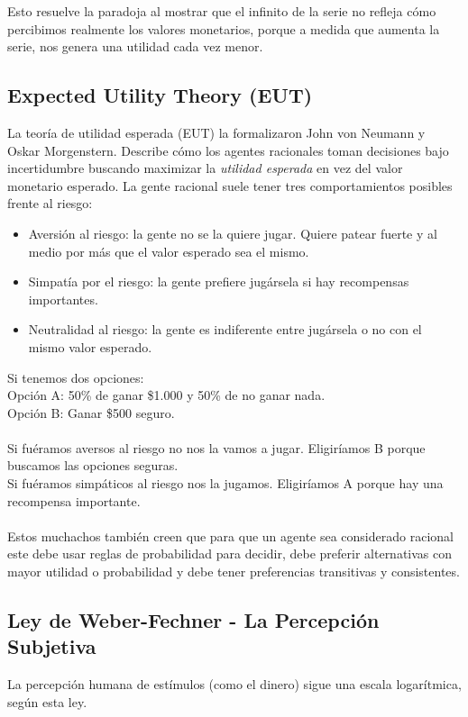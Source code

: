 \documentclass{article}
\begin{document}
            Esto resuelve la paradoja al mostrar que el infinito de la serie no refleja cómo percibimos realmente los valores monetarios, porque a medida que aumenta la serie, nos genera una utilidad cada vez menor.
        \subsection*{Expected Utility Theory (EUT)}
            La teoría de utilidad esperada (EUT) la formalizaron John von Neumann y Oskar Morgenstern. Describe cómo los agentes racionales toman decisiones bajo incertidumbre buscando maximizar la \emph{utilidad esperada} en vez del valor monetario esperado. La gente racional suele tener tres comportamientos posibles frente al riesgo:
            \begin{itemize}
                \item Aversión al riesgo: la gente no se la quiere jugar. Quiere patear fuerte y al medio por más que el valor esperado sea el mismo.
                \item Simpatía por el riesgo: la gente prefiere jugársela si hay recompensas importantes.
                \item Neutralidad al riesgo: la gente es indiferente entre jugársela o no con el mismo valor esperado.
            \end{itemize}
            Si tenemos dos opciones: \\
            Opción A: 50\% de ganar \$1.000 y 50\% de no ganar nada. \\
            Opción B: Ganar \$500 seguro.\\
            \\
            Si fuéramos aversos al riesgo no nos la vamos a jugar. Eligiríamos B porque buscamos las opciones seguras. \\
            Si fuéramos simpáticos al riesgo nos la jugamos. Eligiríamos A porque hay una recompensa importante. \\
            \\
            Estos muchachos también creen que para que un agente sea considerado racional este debe usar reglas de probabilidad para decidir, debe preferir alternativas con mayor utilidad o probabilidad y debe tener preferencias transitivas y consistentes.
        \subsection*{Ley de Weber-Fechner - La Percepción Subjetiva}
            La percepción humana de estímulos (como el dinero) sigue una escala logarítmica, según esta ley.
\end{document}
